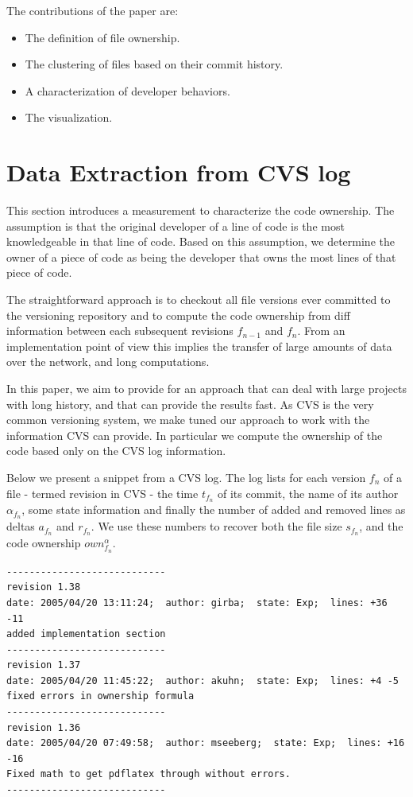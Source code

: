 The contributions of the paper are:
\begin{itemize}
\item The definition of file ownership.
\item The clustering of files based on their commit history.
\item A characterization of developer behaviors.
\item The \omap visualization.
\end{itemize}

\section{Data Extraction from CVS log}\label{sec:ownership}

This section introduces a measurement to characterize the code ownership. The assumption is that the original developer of a line of code is the most knowledgeable in that line of code. Based on this assumption, we determine the owner of a piece of code as being the developer that owns the most lines  of that piece of code.

The straightforward approach is to checkout all file versions ever committed to the versioning repository and to compute the code ownership from diff information between each subsequent revisions $f_{n-1}$ and $f_n$. From an implementation point of view this implies the transfer of large amounts of data over the network, and long computations.

In this paper, we aim to provide for an approach that can deal with large projects with long history, and that can provide the results fast. As CVS is the very common versioning system, we make tuned our approach to work with the information CVS can provide. In particular we compute the ownership of the code based only on the CVS log information.

Below we present a snippet from a CVS log. The log lists for each version $f_n$ of a file \-- termed revision in CVS \-- the time $t_{f_n}$ of its commit, the name of its author $\alpha_{f_n}$, some state information and finally the number of added and removed lines as deltas $a_{f_n}$ and $r_{f_n}$. We use these numbers to recover both the file size $s_{f_n}$, and the code ownership $own_{f_n}^\alpha$.

\begin{tiny}\begin{verbatim}
----------------------------
revision 1.38
date: 2005/04/20 13:11:24;  author: girba;  state: Exp;  lines: +36 -11
added implementation section
----------------------------
revision 1.37
date: 2005/04/20 11:45:22;  author: akuhn;  state: Exp;  lines: +4 -5
fixed errors in ownership formula
----------------------------
revision 1.36
date: 2005/04/20 07:49:58;  author: mseeberg;  state: Exp;  lines: +16 -16
Fixed math to get pdflatex through without errors.
----------------------------
\end{verbatim}\end{tiny}

